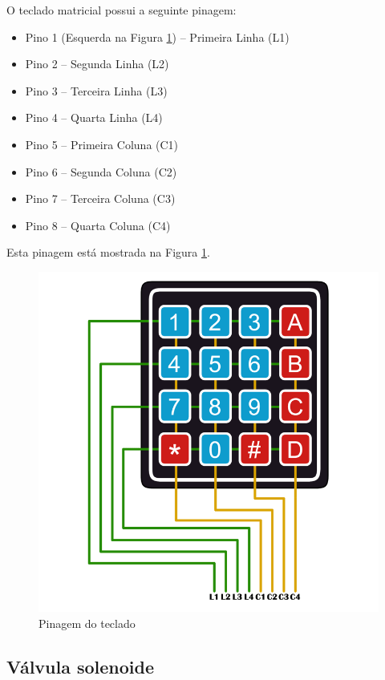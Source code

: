 O teclado matricial possui a seguinte pinagem:

\begin{itemize}
	\item Pino 1 (Esquerda na Figura \ref{fig:teclado-pins}) – Primeira Linha (L1)
	\item Pino 2 – Segunda Linha (L2)
	\item Pino 3 – Terceira Linha (L3)
	\item Pino 4 – Quarta Linha (L4)
	\item Pino 5 – Primeira Coluna (C1)
	\item Pino 6 – Segunda Coluna (C2)
	\item Pino 7 – Terceira Coluna (C3)
	\item Pino 8 – Quarta Coluna (C4)
\end{itemize}

Esta pinagem está mostrada na Figura \ref{fig:teclado-pins}.

\begin{figure}[htbp]
	\centering
	\includegraphics[scale=0.3]{figuras/keypad-1024x1024-pins.png}
	\caption{Pinagem do teclado}
	\label{fig:teclado-pins}
\end{figure}

\subsection{Válvula solenoide}

